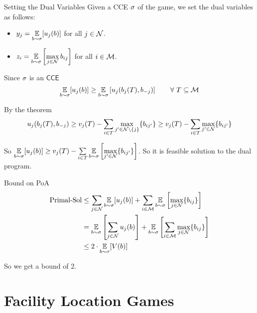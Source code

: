 \documentclass[aspectratio=1610]{beamer}
\begin{document}
\begin{frame}{Setting the Dual Variables}
    Given a \textsf{CCE} $\sigma$ of the game, we set the dual variables as follows:
    \begin{itemize}
        \item $y_j=\underset{b\sim \sigma}{\mathbb{E}}[u_j(b)]$ for all $j\in\mathcal{N}$.\pause
        
        \item $z_i=\underset{b\sim \sigma}{\mathbb{E}}  \left[\max\limits_{j\in\mathcal{N}}b_{ij}\right]$ for all $i\in\mathcal{M}$.
    \end{itemize}\pause

    Since $\sigma$ is an $\textsf{CCE}$ $$\underset{b\sim \sg}{\bbE}[u_j(b)]\geq \underset{b\sim \sg}{\bbE}\lt[u_j(b_j(T),b_{-j})\rt]\qquad \forall\ T\subseteq \mcM$$\pause

    By the theorem $$u_j(b_j(T),b_{-j})\geq v_j(T)-\sum\limits_{i\in T}\max\limits_{j'\in \mathcal{N}\setminus \{j\}}\{b_{ij'}\}\geq v_j(T)-\sum\limits_{i\in T}\max\limits_{j'\in \mathcal{N}}\{b_{ij'}\}$$ \pause

So $\underset{b\sim \sigma}{\mathbb{E}}[u_j(b)]\geq v_j(T)-\sum\limits_{i\in T}\underset{b\sim \sigma}{\mathbb{E}}\left[\max\limits_{j'\in \mathcal{N}}\{b_{ij'}\}\right]$. So it is feasible solution to the dual program.

\end{frame}
\begin{frame}{Bound on \textsf{PoA}}
    \begin{align*}
        \text{Primal-Sol} & \leq \sum_{j\in\mathcal{N}}\underset{b\sim \sigma}{\mathbb{E}}[u_j(b)]+\sum_{i\in\mathcal{M}}\underset{b\sim \sigma}{\mathbb{E}}\left[\max\limits_{j\in \mathcal{N}}\{b_{ij}\}\right]\\
        & = \underset{b\sim \sigma}{\mathbb{E}}\left[\sum_{j\in\mathcal{N}}u_j(b)\right]+\underset{b\sim \sigma}{\mathbb{E}}\left[\sum_{i\in\mathcal{M}}\max\limits_{j\in \mathcal{N}}\{b_{ij}\}\right]\\
        & \leq 2\cdot \underset{b\sim \sigma}{\mathbb{E}}[V(b)]
    \end{align*}\pause

    So we get a bound of \textcolor{myr}{2}.

\end{frame}

\section{Facility Location Games}
\end{document}
